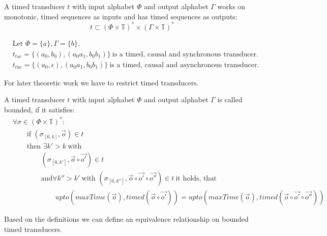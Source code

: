 \begin{definition}[name = Timed Transducer]\label{def:timed_transducer}
  A timed transducer \(t\) with input alphabet \(\Phi\) and output alphabet \(\Gamma\) works on monotonic, timed sequences as inputs and has timed sequences as outputs:
  \[t \subset {\left(\Phi \times \mathbb{T}\right)}^* \times {\left(\Gamma \times \mathbb{T}\right)}^*\]
\end{definition}

\begin{exmp}[name=Timed Transducers]
  \begin{align*}
    &\text{Let } \Phi = \{a\}, \Gamma = \{b\}.\\
    &t_{tsc} = \{(a_0, b_0),(a_0a_1, b_0b_1)\}\ \text{is a timed, causal and synchronous transducer.}\\
    &t_{tac} = \{(a_0, \epsilon),(a_0a_1, b_0b_1)\}\ \text{is a timed, causal and asynchronous transducer.}
  \end{align*}
\end{exmp}

For later theoretic work we have to restrict timed transducers.

\begin{definition}[name = Boundedness of Timed Transducers]\label{def:boundedness_timed_transducer}
  A timed transducer \(t\) with input alphabet \(\Phi\) and output alphabet \(\Gamma\) is called bounded, if it satisfies:
  \begin{align*}
    &\forall \sigma \in {(\Phi \times \mathbb{T})}^*:\\
    &\hspace{2em}\text{if } (\sigma_{[0,k]}, \vec{o}) \in t\\
    &\hspace{2em}\text{then }\exists k' > k\ \text{with}\\
    &\hspace{4em}(\sigma_{[0,k']}, \vec{o} \circ \vec{o'}) \in t\\
    &\hspace{4em}\text{and} \forall k'' > k'\ \text{with } (\sigma_{[0,k'']}, \vec{o}\circ\vec{o'}\circ\vec{o''}) \in t\ \text{it holds, that}\\
    &\hspace{6em}\mathit{upto}(\mathit{maxTime}(\vec{o}), \mathit{timed}(\vec{o}\circ\vec{o'})) = \mathit{upto}(\mathit{maxTime}(\vec{o}), \mathit{timed}(\vec{o}\circ\vec{o'}\circ\vec{o''}))
  \end{align*}
\end{definition}
Based on the definitions we can define an equivalence relationship on bounded timed transducers.

